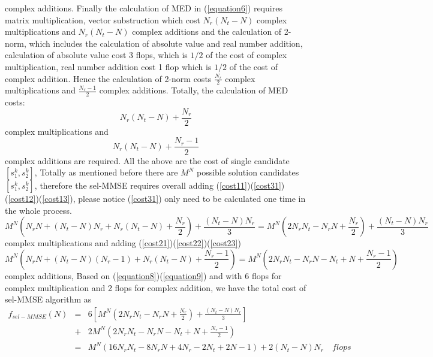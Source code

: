 \documentclass[12pt,a4paper,final]{article}
\begin{document}
\begin{spacing}{2.5}
complex additions. Finally the calculation of MED in (\ref{equation6}) requires matrix multiplication, vector substruction which cost $ N_{r}(N_{t}-N)$ complex multiplications and $ N_{r}(N_{t}-N)$ complex additions and the calculation of 2-norm, which includes the calculation of absolute value and real number addition, calculation of absolute value cost 3 flops, which is $1/2$ of the cost of complex multiplication, real number addition cost 1 flop which is $1/2$ of the cost of complex addition. Hence the calculation of 2-norm costs $\frac{N_{r}}{2}$ complex multiplications and $\frac{N_{r}-1}{2}$ complex additions. Totally, the calculation of MED costs:
 \begin{equation}
  N_{r}(N_{t}-N)+\frac{N_{r}}{2}\label{cost13}
\end{equation}  
 complex multiplications and
 \begin{equation}
   N_{r}(N_{t}-N)+\frac{N_{r}-1}{2}\label{cost23}
 \end{equation}
complex additions are required. All the above are the cost of single candidate  $[s_{1}^{k},s_{2}^{k}]$, Totally as mentioned before there are $M^N$ possible solution candidates $[s_{1}^{k},s_{2}^{k}]$, therefore the sel-MMSE requires overall adding (\ref{cost11})(\ref{cost31})(\ref{cost12})(\ref{cost13}), please notice (\ref{cost31}) only need to be calculated one time in the whole process.
\begin{equation}
M^{N}(N_rN+(N_{t}-N)N_r+N_r(N_t-N)+\frac{N_r}{2})+\frac{(N_{t}-N)N_{r}}{3}=M^{N}(2N_{r}N_{t}-N_{r}N+\frac{N_r}{2})+\frac{(N_{t}-N)N_r}{3}\label{equation8}
\end{equation}
complex multiplications and adding (\ref{cost21})(\ref{cost22})(\ref{cost23})
\begin{equation}
M^{N}(N_rN+(N_t-N)(N_r-1)+N_r(N_t-N)+\frac{N_r-1}{2})=M^{N}(2N_{r}N_{t}-N_{r}N-N_{t}+N+\frac{N_{r}-1}{2})\label{equation9}
\end{equation}
complex additions, Based on (\ref{equation8})(\ref{equation9}) and with 6 flops for complex multiplication and 2 flops for complex addition, we have the total cost of sel-MMSE algorithm as
\begin{eqnarray}
\nonumber
f_{sel-MMSE}(N) &=& 6[M^{N}(2N_{r}N_{t}-N_{r}N+\frac{N_r}{2})+\frac{(N_{t}-N)N_r}{3}]\\  
&+&2M^{N}(2N_{r}N_{t}-N_{r}N-N_{t}+N+\frac{N_{r}-1}{2})\\
\nonumber 
&=&M^{N}(16N_{r}N_{t}-8N_{r}N+4N_{r}-2N_{t}+2N-1)+2(N_{t}-N)N_{r}\quad flops  \label{equation10}
\end{eqnarray}

\end{spacing}
\end{document}
